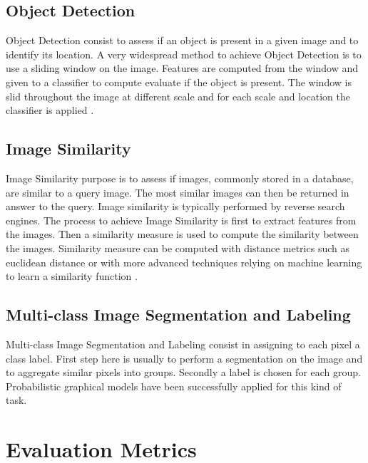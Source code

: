 
  \subsection{Object Detection}

    Object Detection consist to assess if an object is present in a given image and to identify its location. A very widespread method to achieve Object Detection is to use a sliding window on the image. Features are computed from the window and given to a classifier to compute evaluate if the object is present. The window is slid throughout the image at different scale and for each scale and location the classifier is applied \cite{viola2004robust} \cite{dalal2005histograms}.

  \subsection{Image Similarity}

    Image Similarity purpose is to assess if images, commonly stored in a database, are similar to a query image. The most similar images can then be returned in answer to the query. Image similarity is typically performed by reverse search engines. The process to achieve Image Similarity is first to extract features from the images. Then a similarity measure is used to compute the similarity between the images. Similarity measure can be computed with distance metrics such as euclidean distance or with more advanced techniques relying on machine learning to learn a similarity function \cite{chechik2010large}.

  \subsection{Multi-class Image Segmentation and Labeling}

    Multi-class Image Segmentation and Labeling consist in assigning to each pixel a class label. First step here is usually to perform a segmentation on the image and to aggregate similar pixels into groups. Secondly a label is chosen for each group. Probabilistic graphical models have been successfully applied for this kind of task. 


  \section{Evaluation Metrics}


